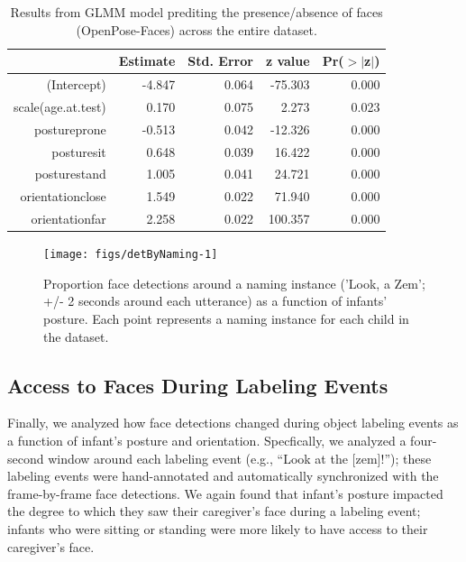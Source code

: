 \documentclass[10pt, letterpaper]{article}
\newenvironment{CodeChunk}{}{}
\begin{document}
\begin{table}[H]
\centering
\begin{tabular}{rrrrr}
  \hline
 & Estimate & Std. Error & z value & Pr($>$$|$z$|$) \\ 
  \hline
(Intercept) & -4.847 & 0.064 & -75.303 & 0.000 \\ 
  scale(age.at.test) & 0.170 & 0.075 & 2.273 & 0.023 \\ 
  postureprone & -0.513 & 0.042 & -12.326 & 0.000 \\ 
  posturesit & 0.648 & 0.039 & 16.422 & 0.000 \\ 
  posturestand & 1.005 & 0.041 & 24.721 & 0.000 \\ 
  orientationclose & 1.549 & 0.022 & 71.940 & 0.000 \\ 
  orientationfar & 2.258 & 0.022 & 100.357 & 0.000 \\ 
   \hline
\end{tabular}
\caption{Results from GLMM model prediting the presence/absence of faces (OpenPose-Faces) across the entire dataset.} 
\end{table}

\begin{CodeChunk}
\begin{figure}[H]

{\centering \texttt{[image: figs/detByNaming-1]} 

}

\caption[Proportion face detections around a naming instance ('Look, a Zem']{Proportion face detections around a naming instance ('Look, a Zem'; +/- 2 seconds around each utterance) as a function of infants' posture. Each point represents a naming instance for each child in the dataset.}\label{fig:detByNaming}
\end{figure}
\end{CodeChunk}

\subsection{Access to Faces During Labeling
Events}\label{access-to-faces-during-labeling-events}

Finally, we analyzed how face detections changed during object labeling
events as a function of infant's posture and orientation. Specfically,
we analyzed a four-second window around each labeling event (e.g.,
``Look at the {[}zem{]}!''); these labeling events were hand-annotated
and automatically synchronized with the frame-by-frame face detections.
We again found that infant's posture impacted the degree to which they
saw their caregiver's face during a labeling event; infants who were
sitting or standing were more likely to have access to their caregiver's
face.
\end{document}
